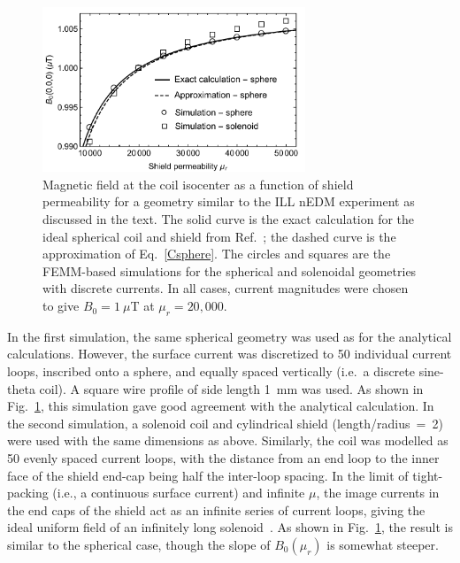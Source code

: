 
\begin{figure}[h!]
\begin{center}
   \includegraphics[width=0.7\textwidth]{femm_and_calcs.pdf}
    \caption{Magnetic field at the coil isocenter as a function of
      shield permeability for a geometry similar to the ILL nEDM
      experiment as discussed in the text.  The solid curve is the
      exact calculation for the ideal spherical coil and shield from
      Ref.~\cite{bib:bidinostimartin}; the dashed curve is the
      approximation of Eq.~\ref{Csphere}. The circles and squares are
      the FEMM-based simulations for the spherical and solenoidal
      geometries with discrete currents.  In all cases, current
      magnitudes were chosen to give $B_0=1~\mu$T at $\mu_r=20,000$.}
    \label{fig:Magnetic_Field}
    \end{center}
\end{figure} 


In the first simulation, the same spherical geometry was used as for
the analytical calculations.  However, the surface current was
discretized to 50 individual current loops, inscribed onto a sphere,
and equally spaced vertically (i.e.~a discrete sine-theta coil).  A
square wire profile of side length 1~mm was used.  As shown in
Fig.~\ref{fig:Magnetic_Field}, this simulation gave good agreement
with the analytical calculation.  In the second simulation, a solenoid
coil and cylindrical shield (length/radius~=~2) were used with the
same dimensions as above.  Similarly, the coil was modelled as 50
evenly spaced current loops, with the distance from an end loop to the
inner face of the shield end-cap being half the inter-loop spacing.
In the limit of tight-packing (i.e., a continuous surface current) and
infinite $\mu$, the image currents in the end caps of the shield act
as an infinite series of current loops, giving the ideal uniform field
of an infinitely long solenoid~\cite{bib:lambert,bib:sumner}.  As
shown in Fig.~\ref{fig:Magnetic_Field}, the result is similar to the
spherical case, though the slope of $B_0(\mu_r)$ is somewhat steeper.

